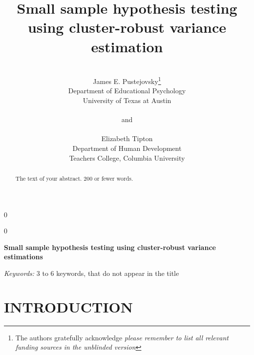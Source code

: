 \documentclass[12pt]{article}\usepackage[]{graphicx}\usepackage[]{color}
\newcommand{\blind}{0}
\begin{document}

\def\spacingset#1{\renewcommand{\baselinestretch}%
{#1}\small\normalsize} \spacingset{1}



\blind
{
  \title{\bf Small sample hypothesis testing using cluster-robust variance estimation}
  \author{\\James E. Pustejovsky\thanks{
    The authors gratefully acknowledge \textit{please remember to list all relevant funding sources in the unblinded version}}\hspace{.2cm}\\
    Department of Educational Psychology \\ 
    University of Texas at Austin\\ \\
    and \\ \\
    Elizabeth Tipton \\
    Department of Human Development \\ 
    Teachers College, Columbia University}
  \maketitle
} \fi

\blind
{
  \bigskip
  \bigskip
  \bigskip
  \begin{center}
    {\LARGE\bf Small sample hypothesis testing using cluster-robust variance estimations}
\end{center}
  \medskip
} \fi

\bigskip
\begin{abstract}
The text of your abstract.  200 or fewer words.
\end{abstract}

\noindent%
{\it Keywords:}  3 to 6 keywords, that do not appear in the title
\vfill

\newpage
\spacingset{1.45} %

\section{INTRODUCTION}
\label{sec:intro}
\end{document}
